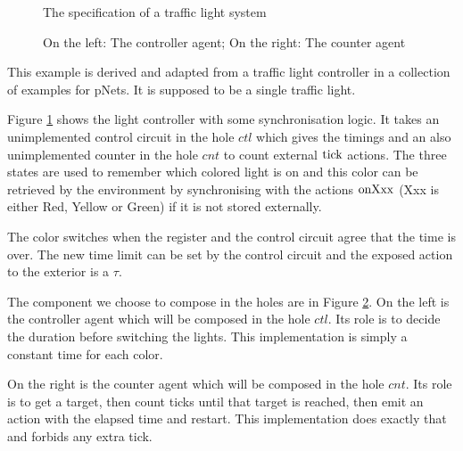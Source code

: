\documentclass{article}
\begin{document}
\begin{exi}
\begin{figure}
\centering

\caption{The specification of a traffic light system}
\label{fig:tls}
\end{figure}
\begin{figure}
\centering

\vrule

\caption{On the left: The controller agent; On the right: The counter agent}
\label{fig:tlh}
\end{figure}
This example is derived and adapted from a traffic light controller in a collection of examples for pNets.
It is supposed to be a single traffic light.

Figure \ref{fig:tls} shows the light controller with some synchronisation logic.
It  takes an unimplemented control circuit in the hole \(ctl\) which gives the timings and an also unimplemented counter in the hole \(cnt\) to count external \(\mathrm{tick}\) actions.
The three states are used to remember which colored light is on and this color can be retrieved by the environment by synchronising with the actions \(\mathrm{onXxx}\) (Xxx is either Red, Yellow or Green) if it is not stored externally.

The color switches when the register and the control circuit agree that the time is over.
The new time limit can be set by the control circuit and the exposed action to the exterior is a \(\tau\).

The component we choose to compose in the holes are in Figure \ref{fig:tlh}.
On the left is the controller agent which will be composed in the hole \(ctl\).
Its role is to decide the duration before switching the lights.
This implementation is simply a constant time for each color.

On the right is the counter agent which will be composed in the hole \(cnt\).
Its role is to get a target, then count ticks until that target is reached, then emit an action with the elapsed time and restart.
This implementation does exactly that and forbids any extra tick.


\end{exi}
\end{document}
